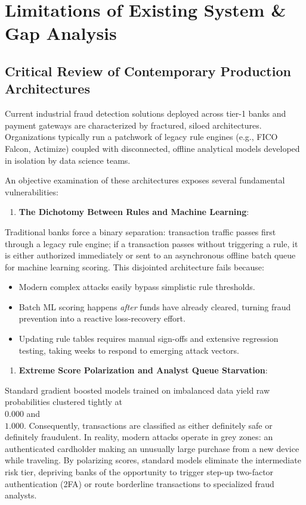 \documentclass[12pt,a4paper,oneside]{report}
\begin{document}
\section{Limitations of Existing System \& Gap Analysis}

\subsection{Critical Review of Contemporary Production Architectures}

Current industrial fraud detection solutions deployed across tier-1 banks and payment gateways are characterized by fractured, siloed architectures. Organizations typically run a patchwork of legacy rule engines (e.g., FICO Falcon, Actimize) coupled with disconnected, offline analytical models developed in isolation by data science teams.


An objective examination of these architectures exposes several fundamental vulnerabilities:


\begin{enumerate}[leftmargin=0.35in]
\item \textbf{The Dichotomy Between Rules and Machine Learning}:
\end{enumerate}
Traditional banks force a binary separation: transaction traffic passes first through a legacy rule engine; if a transaction passes without triggering a rule, it is either authorized immediately or sent to an asynchronous offline batch queue for machine learning scoring. This disjointed architecture fails because:

\begin{itemize}[leftmargin=0.35in]
\item Modern complex attacks easily bypass simplistic rule thresholds.
\item Batch ML scoring happens \textit{after} funds have already cleared, turning fraud prevention into a reactive loss-recovery effort.
\item Updating rule tables requires manual sign-offs and extensive regression testing, taking weeks to respond to emerging attack vectors.
\end{itemize}

\begin{enumerate}[leftmargin=0.35in]
\item \textbf{Extreme Score Polarization and Analyst Queue Starvation}:
\end{enumerate}
Standard gradient boosted models trained on imbalanced data yield raw probabilities clustered tightly at \\$0.000$ and \\$1.000$. Consequently, transactions are classified as either definitely safe or definitely fraudulent. In reality, modern attacks operate in grey zones: an authenticated cardholder making an unusually large purchase from a new device while traveling. By polarizing scores, standard models eliminate the intermediate risk tier, depriving banks of the opportunity to trigger step-up two-factor authentication (2FA) or route borderline transactions to specialized fraud analysts.
\end{document}
